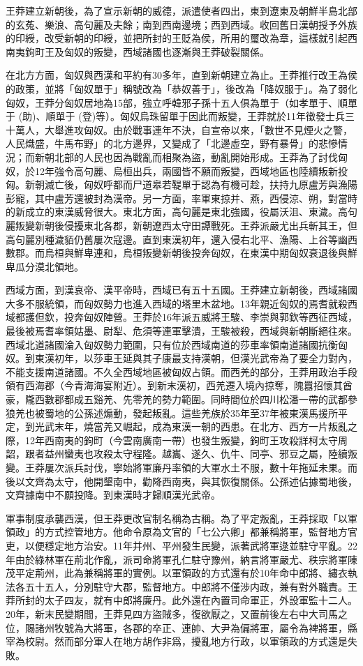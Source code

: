 王莽建立新朝後，為了宣示新朝的威德，派遣使者四出，東到遼東及朝鮮半島北部的玄菟、樂浪、高句麗及夫餘；南到西南邊境；西到西域。收回舊日漢朝授予外族的印綬，改受新朝的印綬，並把所封的王貶為侯，所用的璽改為章，這樣就引起西南夷鉤町王及匈奴的叛變，西域諸國也逐漸與王莽破裂關係。

在北方方面，匈奴與西漢和平約有30多年，直到新朝建立為止。王莽推行改王為侯的政策，並將「匈奴單于」稱號改為「恭奴善于」，後改為「降奴服于」。為了弱化匈奴，王莽分匈奴居地為15部，強立呼韓邪子孫十五人俱為單于（如孝單于、順單于 (助)、順單于 (登)等）。匈奴烏珠留單于因此而叛變，王莽就於11年徵發士兵三十萬人，大舉進攻匈奴。由於戰事連年不決，自宣帝以來，「數世不見煙火之警，人民熾盛，牛馬布野」的北方邊界，又變成了「北邊虛空，野有暴骨」的悲慘情況；而新朝北部的人民也因為戰亂而相聚為盜，動亂開始形成。王莽為了討伐匈奴，於12年強令高句麗、烏桓出兵，兩國皆不願而叛變，西域地區也陸續叛新投匈。新朝滅亡後，匈奴呼都而尸道皋若鞮單于認為有機可趁，扶持九原盧芳與漁陽彭寵，其中盧芳還被封為漢帝。另一方面，率軍東掠并、燕，西侵涼、朔，對當時的新成立的東漢威脅很大。東北方面，高句麗是東北強國，役屬沃沮、東濊。高句麗叛變新朝後侵擾東北各郡，新朝遼西太守田譚戰死。王莽派嚴尤出兵斬其王，但高句麗別種濊貊仍舊屢次寇邊。直到東漢初年，還入侵右北平、漁陽、上谷等幽西數郡。而烏桓與鮮卑連和，烏桓叛變新朝後投奔匈奴，在東漢中期匈奴衰退後與鮮卑瓜分漠北領地。

西域方面，到漢哀帝、漢平帝時，西域已有五十五國。王莽建立新朝後，西域諸國大多不服統領，而匈奴勢力也進入西域的塔里木盆地。13年親近匈奴的焉耆就殺西域都護但欽，投奔匈奴陣營。王莽於16年派五威將王駿、李崇與郭欽等西征西域，最後被焉耆率領姑墨、尉犁、危須等連軍擊潰，王駿被殺，西域與新朝斷絕往來。西域北道諸國淪入匈奴勢力範圍，只有位於西域南道的莎車率領南道諸國抗衡匈奴。到東漢初年，以莎車王延與其子康最支持漢朝，但漢光武帝為了要全力對內，不能支援南道諸國。不久全西域地區被匈奴占領。而西羌的部分，王莽用政治手段領有西海郡（今青海海宴附近）。到新末漢初，西羌遷入境內掠奪，隗囂招懷其酋豪，隴西數郡都成五谿羌、先零羌的勢力範圍。同時間位於四川松潘一帶的武都參狼羌也被蜀地的公孫述煽動，發起叛亂。這些羌族於35年至37年被東漢馬援所平定，到光武末年，燒當羌又崛起，成為東漢一朝的西患。在北方、西方一片叛亂之際，12年西南夷的鉤町（今雲南廣南一帶）也發生叛變，鉤町王攻殺牂柯太守周韶，跟者益州蠻夷也攻殺太守程隆。越巂、遂久、仇牛、同亭、邪豆之屬，陸續叛變。王莽屢次派兵討伐，寧始將軍廉丹率領的大軍水土不服，數十年拖延未果。而後以文齊為太守，他開墾南中，勸降西南夷，與其恢復關係。公孫述佔據蜀地後，文齊據南中不願投降。到東漢時才歸順漢光武帝。

軍事制度承襲西漢，但王莽更改官制名稱為古稱。為了平定叛亂，王莽採取「以軍領政」的方式控管地方。他命令原為文官的「七公六卿」都兼稱將軍，監督地方官吏，以便穩定地方治安。11年并州、平州發生民變，派著武將軍逯並駐守平亂。22年由於綠林軍在荊北作亂，派司命將軍孔仁駐守豫州，納言將軍嚴尤、秩宗將軍陳茂平定荊州，此為兼稱將軍的實例。以軍領政的方式還有於10年命中郎將、繡衣執法各五十五人，分別駐守大郡，監督地方。中郎將不僅涉内政，兼有對外職責。王莽所封的太子四友，就有中郎將廉丹。此外還在內置司命軍正，外設軍監十二人。20年，新末民變期間，王莽見四方盜賊多，復欲厭之，又置前後左右中大司馬之位，賜諸州牧號為大將軍，各郡的卒正、連帥、大尹為偏將軍，屬令為裨將軍，縣宰為校尉。然而部分軍人在地方胡作非爲，擾亂地方行政，以軍領政的方式還是失敗。

